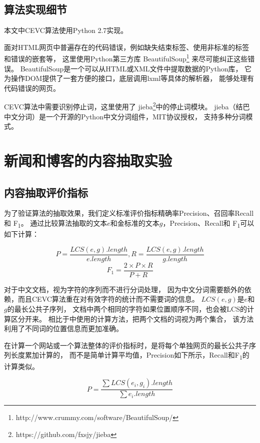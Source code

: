 \subsection{算法实现细节}
本文中CEVC算法使用Python 2.7实现。

面对HTML网页中普遍存在的代码错误，例如缺失结束标签、使用非标准的标签和错误的嵌套等，
这里使用Python第三方库
BeautifulSoup\footnote{http://www.crummy.com/software/BeautifulSoup/}
来尽可能纠正这些错误。
BeautifulSoup是一个可以从HTML或XML文件中提取数据的Python库，
它为操作DOM提供了一套方便的接口，底层调用lxml等具体的解析器，
能够处理有代码错误的网页。

CEVC算法中需要识别停止词，这里使用了
jieba\footnote{https://github.com/fxsjy/jieba}中的停止词模块。
jieba（结巴中文分词）是一个开源的Python中文分词组件，MIT协议授权，
支持多种分词模式。

\section{新闻和博客的内容抽取实验}
\label{sec:cevc-experiment}

\subsection{内容抽取评价指标}
为了验证算法的抽取效果，我们定义标准评价指标精确率Precision、召回率Recall和
F\textsubscript{1}。
通过比较算法抽取的文本$e$和金标准的文本$g$，Precision、Recall和
F\textsubscript{1}可以如下计算：

\begin{equation}
P = \frac{LCS(e,g).length}{e.length}, R = \frac{LCS(e,g).length}{g.length}
\end{equation}
\begin{equation}
F_1 = \frac{2 \times P \times R}{P + R}
\end{equation}

对于中文文档，视为字符的序列而不进行分词处理，
因为中文分词需要额外的依赖，而且CEVC算法重在对有效字符的统计而不需要词的信息。
$LCS(e,g)$是$e$和$g$的最长公共子序列，
文档中两个相同的字符如果位置顺序不同，也会被LCS的计算区分开来。
相比于\cite{weninger2010cetr}中使用的计算方法，把两个文档的词视为两个集合，
该方法利用了不同词的位置信息而更加准确。

在计算一个网站或一个算法整体的评价指标时，是将每个单独网页的最长公共子序列长度累加计算的，
而不是简单计算平均值，Precision如下所示，Recall和F\textsubscript{1}的计算类似。

\begin{equation}
P = \frac{\sum LCS(e_i,g_i).length}{\sum e_i.length}
\end{equation}

